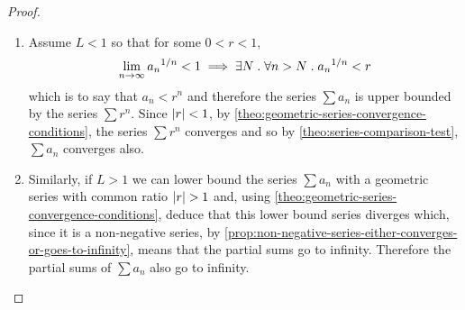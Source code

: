 \documentclass[../MathsNotesBase.tex]{subfiles}
\begin{document}
{		\bigskip
		\begin{proof}\nl
			\begin{enumerate}[label=(\roman*)]
				\item Assume ${ L < 1 }$ so that for some ${ 0 < r < 1 }$,
				\[ \lim_{n \to \infty} {a_n}^{1/n} < 1 \implies \exists N \;.\; \forall n > N \;.\; {a_n}^{1/n} < r \]
				which is to say that ${ a_n < r^n }$ and therefore the series ${ \sum a_n }$ is upper bounded by the series ${ \sum r^n }$. Since ${ \left\lvert r\right\rvert < 1 }$, by \autoref{theo:geometric-series-convergence-conditions}, the series ${ \sum r^n }$ converges and so by \autoref{theo:series-comparison-test}, ${ \sum a_n }$ converges also.
				
				\bigskip
				\item Similarly, if ${ L > 1 }$ we can lower bound the series ${ \sum a_n }$ with a geometric series with common ratio ${ \left\lvert r\right\rvert > 1 }$ and, using \autoref{theo:geometric-series-convergence-conditions}, deduce that this lower bound series diverges which, since it is a non-negative series, by \autoref{prop:non-negative-series-either-converges-or-goes-to-infinity}, means that the partial sums go to infinity. Therefore the partial sums of ${ \sum a_n }$ also go to infinity. 
			\end{enumerate}			
		\end{proof}
	
}
\end{document}
